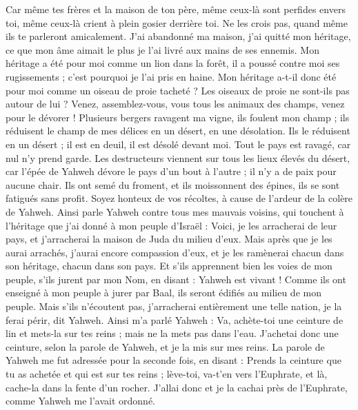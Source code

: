 \begin{multicols}{2}
Car même tes frères et la maison de ton père, même ceux-là sont perfides envers toi, même ceux-là crient à plein gosier derrière toi. Ne les crois pas, quand même ils te parleront amicalement.
J'ai abandonné ma maison, j'ai quitté mon héritage, ce que mon âme aimait le plus je l'ai livré aux mains de ses ennemis.
Mon héritage a été pour moi comme un lion dans la forêt, il a poussé contre moi ses rugissements ; c'est pourquoi je l'ai pris en haine.
Mon héritage a-t-il donc été pour moi comme un oiseau de proie tacheté ? Les oiseaux de proie ne sont-ils pas autour de lui ? Venez, assemblez-vous, vous tous les animaux des champs, venez pour le dévorer !
Plusieurs bergers ravagent ma vigne, ils foulent mon champ ; ils réduisent le champ de mes délices en un désert, en une désolation.
Ils le réduisent en un désert ; il est en deuil, il est désolé devant moi. Tout le pays est ravagé, car nul n’y prend garde.
Les destructeurs viennent sur tous les lieux élevés du désert, car l'épée de Yahweh dévore le pays d’un bout à l’autre ; il n'y a de paix pour aucune chair.
Ils ont semé du froment, et ils moissonnent des épines, ils se sont fatigués sans profit. Soyez honteux de vos récoltes, à cause de l'ardeur de la colère de Yahweh.
Ainsi parle Yahweh contre tous mes mauvais voisins, qui touchent à l'héritage que j'ai donné à mon peuple d'Israël : Voici, je les arracherai de leur pays, et j'arracherai la maison de Juda du milieu d'eux.
Mais après que je les aurai arrachés, j'aurai encore compassion d'eux, et je les ramènerai chacun dans son héritage, chacun dans son pays.
Et s'ils apprennent bien les voies de mon peuple, s’ils jurent par mon Nom, en disant : Yahweh est vivant ! Comme ils ont enseigné à mon peuple à jurer par Baal, ils seront édifiés au milieu de mon peuple.
Mais s'ils n'écoutent pas, j'arracherai entièrement une telle nation, je la ferai périr, dit Yahweh.
\VerseOne{}Ainsi m’a parlé Yahweh : Va, achète-toi une ceinture de lin et mets-la sur tes reins ; mais ne la mets pas dans l'eau.
J'achetai donc une ceinture, selon la parole de Yahweh, et je la mis sur mes reins.
La parole de Yahweh me fut adressée pour la seconde fois, en disant :
Prends la ceinture que tu as achetée et qui est sur tes reins ; lève-toi, va-t’en vers l'Euphrate, et là, cache-la dans la fente d'un rocher.
J’allai donc et je la cachai près de l'Euphrate, comme Yahweh me l’avait ordonné.

\end{multicols}

